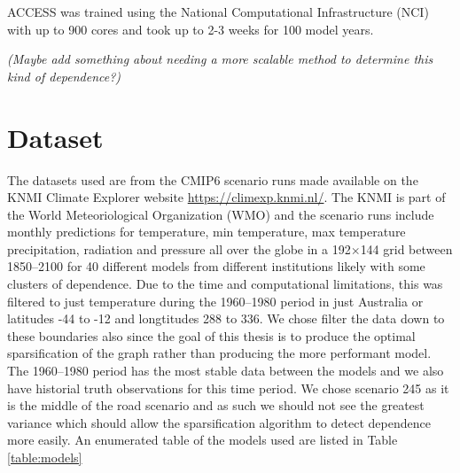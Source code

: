 \documentclass[honours,12pt]{unswthesis}
\numberwithin{equation}{section}
\begin{document}
\noindent ACCESS was trained using the  National Computational Infrastructure (NCI) with up to 900 cores and took up to 2-3 weeks for 100 model years. 

\textit{(Maybe add something about needing a more scalable method to determine this kind of dependence?)}

\section{Dataset}\label{data}
The datasets used are from the CMIP6 scenario runs made available on the KNMI Climate Explorer website \url{https://climexp.knmi.nl/}. 
The KNMI is part of the World Meteoriological Organization (WMO) and the scenario runs include monthly predictions for temperature, min temperature, max temperature
precipitation, radiation and pressure all over the globe in a 192$\times$144 grid between 1850--2100 for 40 different models from different institutions likely with some clusters of dependence. 
Due to the time and computational limitations, 
this was filtered to just temperature during the 1960--1980 period in just Australia or latitudes -44{\textdegree} to -12{\textdegree} and longtitudes 288{\textdegree} to 336{\textdegree}. 
We chose filter the data down to these boundaries also since the goal of this thesis is to produce the optimal sparsification of the graph rather than producing the more performant model.
The 1960--1980 period has the most stable data between the models and we also have historial truth observations for this time period.
We chose scenario 245 as it is the middle of the road scenario and as such we should not see the greatest variance which
should allow the sparsification algorithm to detect dependence more easily. An enumerated table of the models used are listed in Table \ref{table:models}
\end{document}
